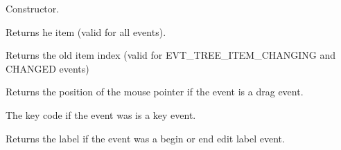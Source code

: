 



Constructor.



Returns he item (valid for all events).



Returns the old item index (valid for EVT\_TREE\_ITEM\_CHANGING and CHANGED events)



Returns the position of the mouse pointer if the event is a drag event.



The key code if the event was is a key event.



Returns the label if the event was a begin or end edit label event.

